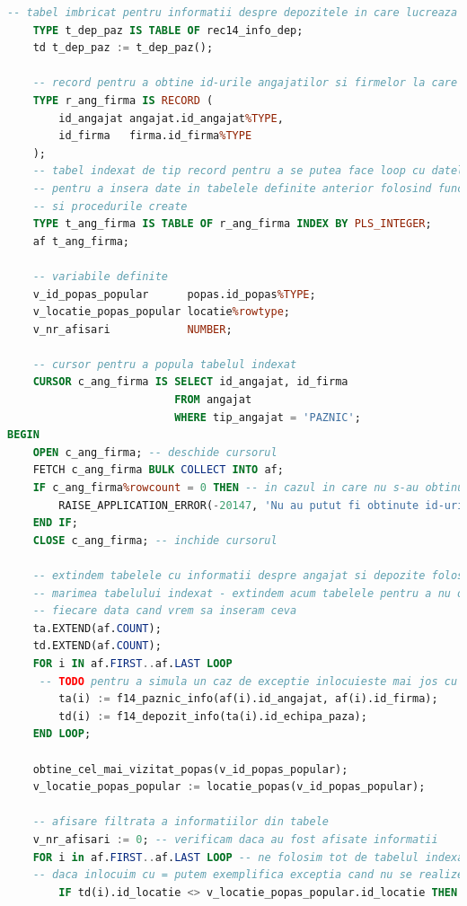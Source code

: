 \documentclass[12pt, a4paper]{article}
\begin{document}
\begin{lstlisting}[language=SQL]
    -- tabel imbricat pentru informatii despre depozitele in care lucreaza paznicii
    TYPE t_dep_paz IS TABLE OF rec14_info_dep;
    td t_dep_paz := t_dep_paz();

    -- record pentru a obtine id-urile angajatilor si firmelor la care lucreaza
    TYPE r_ang_firma IS RECORD (
        id_angajat angajat.id_angajat%TYPE,
        id_firma   firma.id_firma%TYPE
    );
    -- tabel indexat de tip record pentru a se putea face loop cu datele din el
    -- pentru a insera date in tabelele definite anterior folosind functiile
    -- si procedurile create
    TYPE t_ang_firma IS TABLE OF r_ang_firma INDEX BY PLS_INTEGER;
    af t_ang_firma;
    
    -- variabile definite
    v_id_popas_popular      popas.id_popas%TYPE;
    v_locatie_popas_popular locatie%rowtype;
    v_nr_afisari            NUMBER;
    
    -- cursor pentru a popula tabelul indexat
    CURSOR c_ang_firma IS SELECT id_angajat, id_firma
                          FROM angajat
                          WHERE tip_angajat = 'PAZNIC';
BEGIN
    OPEN c_ang_firma; -- deschide cursorul
    FETCH c_ang_firma BULK COLLECT INTO af;
    IF c_ang_firma%rowcount = 0 THEN -- in cazul in care nu s-au obtinut informatii
        RAISE_APPLICATION_ERROR(-20147, 'Nu au putut fi obtinute id-urile paznicilor cu firmele in care lucreaza!');
    END IF;
    CLOSE c_ang_firma; -- inchide cursorul
    
    -- extindem tabelele cu informatii despre angajat si depozite folosind 
    -- marimea tabelului indexat - extindem acum tabelele pentru a nu o face de
    -- fiecare data cand vrem sa inseram ceva
    ta.EXTEND(af.COUNT);
    td.EXTEND(af.COUNT);
    FOR i IN af.FIRST..af.LAST LOOP
     -- TODO pentru a simula un caz de exceptie inlocuieste mai jos cu valori random
        ta(i) := f14_paznic_info(af(i).id_angajat, af(i).id_firma);
        td(i) := f14_depozit_info(ta(i).id_echipa_paza);
    END LOOP;
    
    obtine_cel_mai_vizitat_popas(v_id_popas_popular);
    v_locatie_popas_popular := locatie_popas(v_id_popas_popular);
    
    -- afisare filtrata a informatiilor din tabele
    v_nr_afisari := 0; -- verificam daca au fost afisate informatii
    FOR i in af.FIRST..af.LAST LOOP -- ne folosim tot de tabelul indexat
    -- daca inlocuim cu = putem exemplifica exceptia cand nu se realizeaza afisari
        IF td(i).id_locatie <> v_locatie_popas_popular.id_locatie THEN
        

\end{lstlisting}
\end{document}
